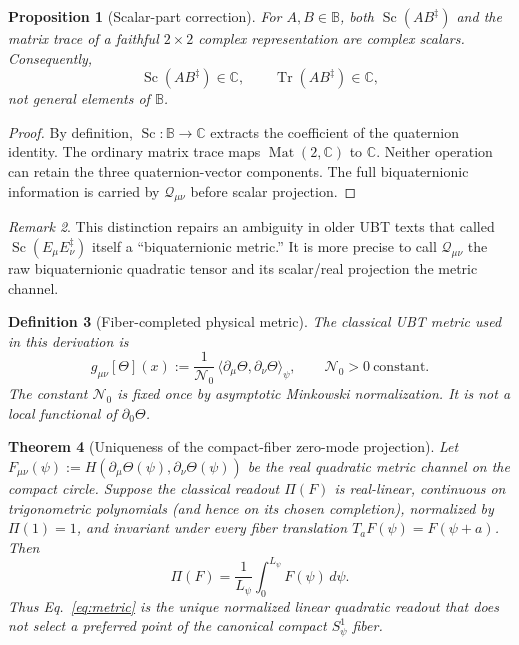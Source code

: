 \documentclass[11pt,a4paper]{article}
\newtheorem{definition}{Definition}[section]
\newtheorem{theorem}[definition]{Theorem}
\newtheorem{proposition}[definition]{Proposition}
\theoremstyle{remark}
\newtheorem{remark}[definition]{Remark}
\newcommand{\B}{\mathbb B}
\newcommand{\Sc}{\operatorname{Sc}}
\newcommand{\Nzero}{\mathcal N_0}
\begin{document}
\begin{proposition}[Scalar-part correction]
For $A,B\in\B$, both $\Sc(AB^\ddagger)$ and the matrix trace of a faithful
$2\times2$ complex representation are complex scalars.  Consequently,
\begin{equation}
  \Sc(AB^\ddagger)\in\mathbb C,
  \qquad
  \operatorname{Tr}(AB^\ddagger)\in\mathbb C,
\end{equation}
not general elements of $\B$.
\end{proposition}

\begin{proof}
By definition, $\Sc:\B\to\mathbb C$ extracts the coefficient of the quaternion
identity.  The ordinary matrix trace maps $\operatorname{Mat}(2,\mathbb C)$ to
$\mathbb C$.  Neither operation can retain the three quaternion-vector
components.  The full biquaternionic information is carried by
$\mathcal Q_{\mu\nu}$ before scalar projection.
\end{proof}

\begin{remark}
This distinction repairs an ambiguity in older UBT texts that called
$\Sc(E_\mu E_\nu^\ddagger)$ itself a ``biquaternionic metric.''  It is more
precise to call $\mathcal Q_{\mu\nu}$ the raw biquaternionic quadratic tensor and
its scalar/real projection the metric channel.
\end{remark}

\begin{definition}[Fiber-completed physical metric]
The classical UBT metric used in this derivation is
\begin{equation}
  \boxed{
  g_{\mu\nu}[\Theta](x)
  :=\frac1{\Nzero}\,
  \langle\partial_\mu\Theta,\partial_\nu\Theta\rangle_\psi,}
  \qquad \Nzero>0\ \text{constant}.
  \label{eq:metric}
\end{equation}
The constant $\Nzero$ is fixed once by asymptotic Minkowski normalization.
It is not a local functional of $\partial_0\Theta$.
\end{definition}

\begin{theorem}[Uniqueness of the compact-fiber zero-mode projection]
Let $F_{\mu\nu}(\psi):=H(\partial_\mu\Theta(\psi),
\partial_\nu\Theta(\psi))$ be the real quadratic metric channel on the compact
circle.  Suppose the classical readout $\Pi(F)$ is real-linear, continuous on
trigonometric polynomials (and hence on its chosen completion), normalized by
$\Pi(1)=1$, and invariant under every fiber translation
$T_aF(\psi)=F(\psi+a)$.  Then
\begin{equation}
 \Pi(F)=\frac1{L_\psi}\int_0^{L_\psi}F(\psi)\,d\psi.
 \label{eq:haarprojection}
\end{equation}
Thus Eq.~\eqref{eq:metric} is the unique normalized linear quadratic readout
that does not select a preferred point of the canonical compact
$S^1_\psi$ fiber.
\end{theorem}
\end{document}
